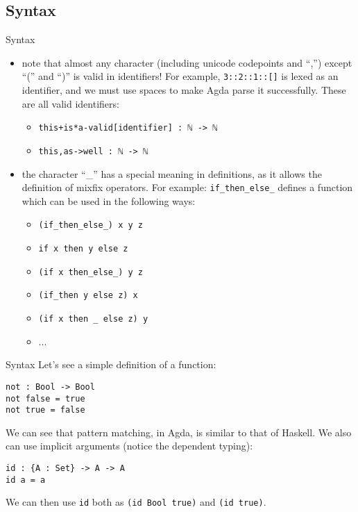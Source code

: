 \documentclass[t,aspectratio=169,9pt]{beamer}
\begin{document}
\subsection[syn]{Syntax}
\begin{frame}[fragile]{Syntax}
  \begin{itemize}
    \vfill
    \item {
	note that almost any character (including unicode codepoints and ``,'')
	except ``('' and ``)'' is valid in identifiers! For example,
	\texttt{3::2::1::[]} is lexed as an identifier, and we must
	use spaces to make Agda parse it successfully. These are all valid
	identifiers:
	\begin{itemize}
	  \item {\texttt{this+is*a-valid[identifier] : ℕ -> ℕ}}
	  \item {\texttt{this,as->well : ℕ -> ℕ}}
	\end{itemize}
      }
    \vfill
    \item {
	the character ``\_'' has a special meaning in definitions, as it allows
	the definition of mixfix operators. For example:
	\texttt{if_then_else_} defines a function which can be
	used in the following ways:
	\begin{itemize}
	  \item {\texttt{(if_then_else_) x y z}}
	  \item {\texttt{if x then y else z}}
	  \item {\texttt{(if x then_else_) y z}}
	  \item {\texttt{(if_then y else z) x}}
	  \item {\texttt{(if x then _ else z) y}}
	  \item {...}
	\end{itemize}
      }
      \vfill
\end{itemize}
  \vfill
\end{frame}
\begin{frame}[fragile]{Syntax}
  \vfill
  Let's see a simple definition of a function:
\begin{verbatim}
not : Bool -> Bool
not false = true
not true = false
\end{verbatim}
We can see that pattern matching, in Agda, is similar to that of Haskell.
We also can use implicit arguments (notice the dependent typing):
\begin{verbatim}
id : {A : Set} -> A -> A
id a = a
\end{verbatim}
We can then use \texttt{id} both as \texttt{(id {Bool}
true)} and \texttt{(id true)}.
  \vfill
\end{frame}
\end{document}

